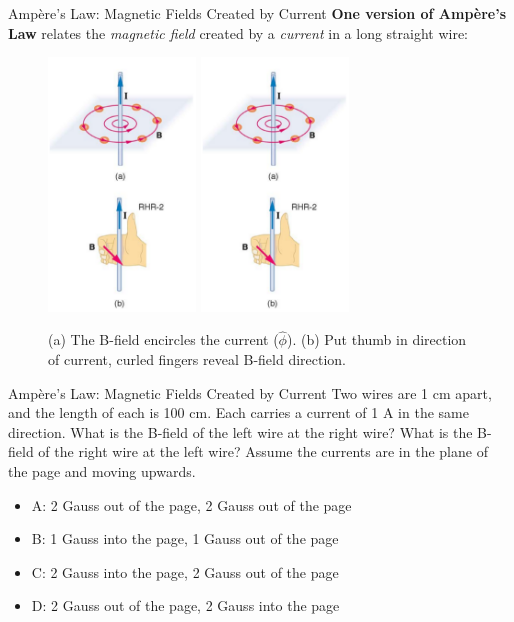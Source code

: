 \documentclass{beamer}
\begin{document}
\begin{frame}{Amp\`{e}re's Law: Magnetic Fields Created by Current}
\textbf{\alert{One version of Amp\`{e}re's Law}} relates the \textit{magnetic field} created by a \textit{current} in a long straight wire:
\begin{figure}
\centering
\includegraphics[width=0.35\textwidth,trim=0cm 10cm 0cm 0cm,clip=true]{figures/rhr2.png}
\includegraphics[width=0.35\textwidth,trim=0cm 0cm 0cm 10cm,clip=true]{figures/rhr2.png}
\caption{\label{fig:amp} (a) The B-field encircles the current ($\hat{\phi}$). (b) Put thumb in direction of current, curled fingers reveal B-field direction.}
\end{figure}
\end{frame}

\begin{frame}{Amp\`{e}re's Law: Magnetic Fields Created by Current}
Two wires are 1 cm apart, and the length of each is 100 cm.  Each carries a current of 1 A in the same direction.  What is the B-field of the left wire at the right wire?  What is the B-field of the right wire at the left wire?  Assume the currents are in the plane of the page and moving upwards.
\begin{itemize}
\item A: 2 Gauss out of the page, 2 Gauss out of the page
\item B: 1 Gauss into the page, 1 Gauss out of the page
\item C: 2 Gauss into the page, 2 Gauss out of the page
\item D: 2 Gauss out of the page, 2 Gauss into the page
\end{itemize}
\end{frame}
\end{document}
